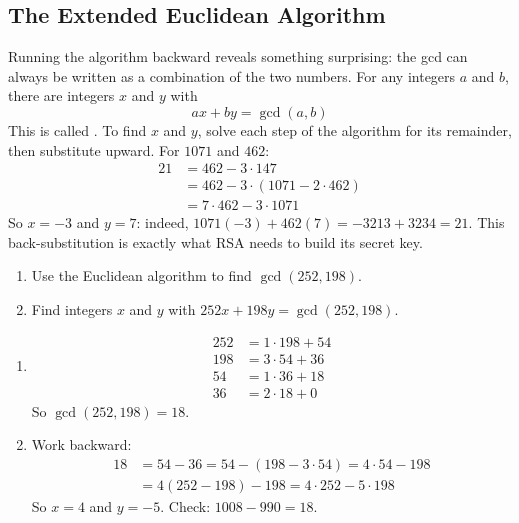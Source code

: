 \subsection{The Extended Euclidean Algorithm}
Running the algorithm backward reveals something surprising: the gcd can
always be written as a combination of the two numbers. For any integers $a$
and $b$, there are integers $x$ and $y$ with
$$ax + by = \gcd(a, b)$$
This is called . To find $x$ and $y$, solve each
step of the algorithm for its remainder, then substitute upward. For
$1071$ and $462$:
\begin{align*}
21 &= 462 - 3 \cdot 147 \\
   &= 462 - 3 \cdot (1071 - 2 \cdot 462) \\
   &= 7 \cdot 462 - 3 \cdot 1071
\end{align*}
So $x = -3$ and $y = 7$: indeed, $1071(-3) + 462(7) = -3213 + 3234 = 21$.
This back-substitution is exactly what RSA needs to build its secret key.

\begin{Exercise}[title={Euclid by Hand}, label=nt_gcd]
\begin{enumerate}
\item Use the Euclidean algorithm to find $\gcd(252, 198)$.
\item Find integers $x$ and $y$ with $252x + 198y = \gcd(252, 198)$.
\end{enumerate}
\end{Exercise}
\begin{Answer}[ref=nt_gcd]
\begin{enumerate}
\item
\begin{align*}
252 &= 1 \cdot 198 + 54 \\
198 &= 3 \cdot 54 + 36 \\
54 &= 1 \cdot 36 + 18 \\
36 &= 2 \cdot 18 + 0
\end{align*}
So $\gcd(252, 198) = 18$.
\item Work backward:
\begin{align*}
18 &= 54 - 36 = 54 - (198 - 3 \cdot 54) = 4 \cdot 54 - 198 \\
   &= 4(252 - 198) - 198 = 4 \cdot 252 - 5 \cdot 198
\end{align*}
So $x = 4$ and $y = -5$. Check: $1008 - 990 = 18$.
\end{enumerate}
\end{Answer}

